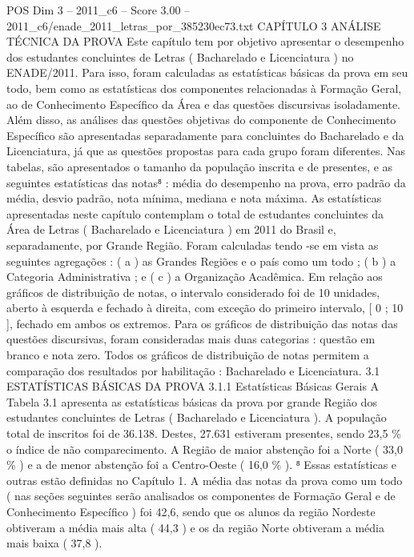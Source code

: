 \begin{textsample}{POS Dim 3 – 2011\_c6 – Score 3.00 – 2011\_c6/enade\_2011\_letras\_por\_385230ec73.txt}  \label{ex:f3_pos_202}
CAPÍTULO 3 ANÁLISE TÉCNICA DA PROVA Este capítulo tem por objetivo apresentar o desempenho dos estudantes concluintes de Letras ( Bacharelado e Licenciatura ) no ENADE/2011.
Para isso, foram calculadas as estatísticas básicas da prova em seu todo, bem como as estatísticas dos componentes relacionadas à Formação Geral, ao de Conhecimento Específico da Área e das questões discursivas isoladamente.
Além disso, as análises das questões objetivas do componente de Conhecimento Específico são apresentadas separadamente para concluintes do Bacharelado e da Licenciatura, já que as questões propostas para cada grupo foram diferentes.
Nas tabelas, são apresentados o tamanho da população inscrita e de presentes, e as seguintes estatísticas das notas⁸ : média do desempenho na prova, erro padrão da média, desvio padrão, nota mínima, mediana e nota máxima.
As estatísticas apresentadas neste capítulo contemplam o total de estudantes concluintes da Área de Letras ( Bacharelado e Licenciatura ) em 2011 do Brasil e, separadamente, por Grande Região.
Foram calculadas tendo -se em vista as seguintes agregações : ( a ) as Grandes Regiões e o país como um todo ; ( b ) a Categoria Administrativa ; e ( c ) a Organização Acadêmica.
Em relação aos gráficos de distribuição de notas, o intervalo considerado foi de 10 unidades, aberto à esquerda e fechado à direita, com exceção do primeiro intervalo, [ 0 ; 10 ], fechado em ambos os extremos.
Para os gráficos de distribuição das notas das questões discursivas, foram consideradas mais duas categorias : questão em branco e nota zero.
Todos os gráficos de distribuição de notas permitem a comparação dos resultados por habilitação : Bacharelado e Licenciatura. 3.1 ESTATÍSTICAS BÁSICAS DA PROVA 3.1.1 Estatísticas Básicas Gerais A Tabela 3.1 apresenta as estatísticas básicas da prova por grande Região dos estudantes concluintes de Letras ( Bacharelado e Licenciatura ).
A população total de inscritos foi de 36.138.
Destes, 27.631 estiveram presentes, sendo 23,5 \% o índice de não comparecimento.
A Região de maior abstenção foi a Norte ( 33,0 \% ) e a de menor abstenção foi a Centro-Oeste ( 16,0 \% ). ⁸ Essas estatísticas e outras estão definidas no Capítulo 1.
A média das notas da prova como um todo ( nas seções seguintes serão analisados os componentes de Formação Geral e de Conhecimento Específico ) foi 42,6, sendo que os alunos da região Nordeste obtiveram a média mais alta ( 44,3 ) e os da região Norte obtiveram a média mais baixa ( 37,8 ).

\end{textsample}

